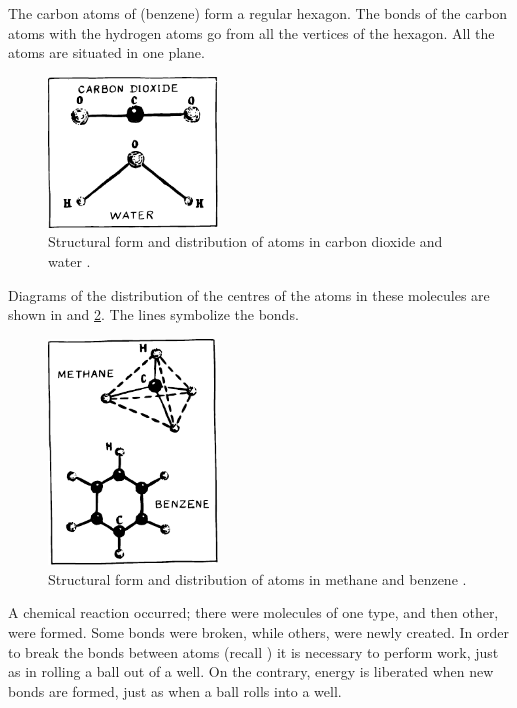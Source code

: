 The carbon atoms of  (benzene) form a regular hexagon. The bonds of the carbon atoms with the hydro­gen atoms go from all the vertices of the hexagon. All the atoms are situated in one plane.

\begin{figure}[!ht]
\centering
\includegraphics[width=0.4\textwidth]{figures/fig-02-02.pdf}
\caption{Structural form and distribution of atoms in carbon dioxide  and water .}
\label{fig-2.2}
\end{figure}

Diagrams of the distribution of the centres of the atoms in these molecules are shown in  and \ref{fig-2.3}. The lines symbolize the bonds.

\begin{figure}[!ht]
\centering
\includegraphics[width=0.4\textwidth,angle=-1]{figures/fig-02-03.pdf}
\caption{Structural form and distribution of atoms in methane  and benzene .}
\label{fig-2.3}
\end{figure}

A chemical reaction occurred; there were molecules of one type, and then other, were formed. Some bonds were broken, while others, were newly created. In order to break the bonds between atoms (recall ) it is necessary to perform work, just as in rolling a ball out of a well. On the contrary, energy is liberated when new bonds are formed, just as when a ball rolls into a well.

